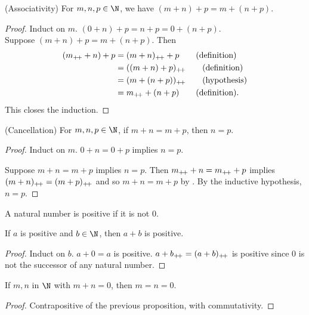 \begin{problem}
    (Associativity) For $m, n, p \in \N$, we have $(m + n) + p = m + (n + p)$.
\end{problem}
\begin{proof}
    Induct on $m$.
    $(0 + n) + p = n + p = 0 + (n + p)$. \\
    Suppose $(m + n) + p = m + (n + p)$.
    Then \begin{align*}
        (m_{+\!+} + n) + p &= (m + n)_{+\!+} + p \tag{definition} \\
                       &= ((m + n) + p)_{+\!+} \tag{definition} \\
                       &= (m + (n + p))_{+\!+} \tag{hypothesis} \\
                       &= m_{+\!+} + (n + p) \tag{definition}.
    \end{align*}
    This closes the induction.
\end{proof}

\begin{problem}
    (Cancellation) For $m, n, p \in \N$, if $m + n = m + p$, then $n = p$.
\end{problem}
\begin{proof}
    Induct on $m$.
    $0 + n = 0 + p$ implies $n = p$.

    Suppose $m + n = m + p$ implies $n = p$.
    Then $m_{+\!+} + n = m_{+\!+} + p$ implies $(m + n)_{+\!+} = (m + p)_{+\!+}$ and so
    $m + n = m + p$ by .
    By the inductive hypothesis, $n = p$.
\end{proof}

\begin{definition}[Positive] \label{def:positive}
    A natural number is positive if it is not $0$.
\end{definition}

\begin{proposition}
    If $a$ is positive and $b \in \N$, then $a + b$ is positive.
\end{proposition}
\begin{proof}
    Induct on $b$.
    $a + 0 = a$ is positive.
    $a + b_{+\!+} = (a + b)_{+\!+}$ is positive since $0$ is not the successor of any
    natural number.
\end{proof}

\begin{problem}
    If $m, n$ in $\N$ with $m + n = 0$, then $m = n = 0$.
\end{problem}
\begin{proof}
    Contrapositive of the previous proposition, with commutativity.
\end{proof}

